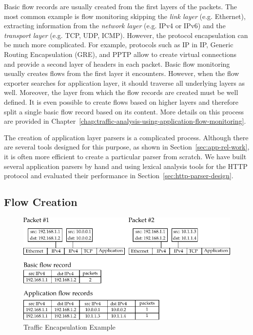 Basic flow records are usually created from the first layers of the packets. The most common example is flow monitoring skipping the \emph{link layer} (e.g. Ethernet), extracting information from the \emph{network layer} (e.g. IPv4 or IPv6) and the \emph{transport layer} (e.g. TCP, UDP, ICMP). However, the protocol encapsulation can be much more complicated. For example, protocols such as IP in IP, Generic Routing Encapsulation (GRE), and PPTP allow to create virtual connections and provide a second layer of headers in each packet. Basic flow monitoring usually creates flows from the first layer it encounters. However, when the flow exporter searches for application layer, it should traverse all underlying layers as well. Moreover, the layer from which the flow records are created must be well defined. It is even possible to create flows based on higher layers and therefore split a single basic flow record based on its content. More details on this process are provided in Chapter~\ref{chap:traffic-analysis-using-application-flow-monitoring}.

The creation of application layer parsers is a complicated process. Although there are several tools designed for this purpose, as shown in Section~\ref{sec:app-rel-work}, it is often more efficient to create a particular parser from scratch. We have built several application parsers by hand and using lexical analysis tools for the HTTP protocol and evaluated their performance in Section~\ref{sec:http-parser-design}.

\subsection{Flow Creation}

\begin{figure}[t!]
  \begin{center}
    \includegraphics{figures/encapsulation}
  \end{center}
  \caption{Traffic Encapsulation Example}
  \label{fig:encapsulation}
\end{figure}

